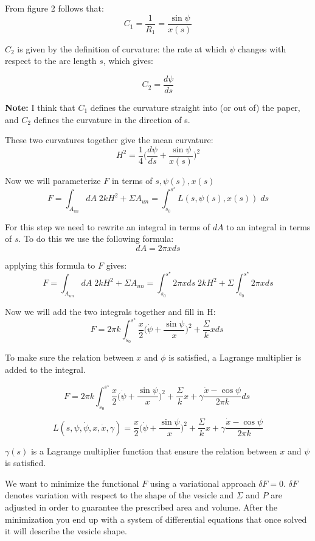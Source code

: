 \documentclass[12pt]{article}
\begin{document}
From figure 2 follows that:
$$
C_1=\frac{1}{R_1}=\frac{\sin{\psi}}{x(s)}
$$

$C_2$ is given by the definition of curvature: the rate at which $\psi$ changes with respect to the arc length $s$, which gives:

$$
C_2=\frac{d\psi}{ds}
$$

\textbf{Note:}  I think that $C_1$ defines the curvature straight into (or out of) the paper, and $C_2$ defines the curvature in the direction of s. 

These two curvatures together give the mean curvature:
$$
H^2=\frac{1}{4}\bigg(\frac{d\psi}{ds}+\frac{\sin{\psi}}{x(s)}\bigg)^2
$$


Now we will parameterize $F$ in terms of $s, \psi(s), x(s)$
$$
F = \int_{A_{un}} dA \; 2kH^2  + \Sigma A_{un} = \int_{s_0}^{s^\star} L(s,\psi(s),x(s)) \; ds
$$


For this step we need to rewrite an integral in terms of $dA$ to an integral in terms of $s$. To do this we use the following formula:
$$
dA=2\pi xds
$$

applying this formula to $F$ gives:
$$
F = \int_{A_{un}} dA \; 2kH^2  + \Sigma A_{un} = \int_{s_0}^{s^\star} 2\pi xds \; 2kH^2 + \Sigma \int_{s_0}^{s^\star} 2\pi x  ds
$$

Now we will add the two integrals together and fill in H:
$$
F = 2\pi k \int_{s_0}^{s^\star} \frac{x}{2} \bigg(\dot{\psi}+\frac{\sin{\psi}}{x}\bigg)^2  + \frac{\Sigma}{k} x ds \;
$$

To make sure the relation between $x$ and $\phi$ is satisfied, a Lagrange multiplier is added to the integral.

$$
F = 2\pi k \int_{s_0}^{s^\star} \frac{x}{2} \bigg(\dot{\psi}+\frac{\sin{\psi}}{x}\bigg)^2  + \frac{\Sigma}{k} x +\gamma\frac{\dot{x}-\cos \psi}{2\pi k}ds\;
$$
 

$$
L(s,\psi,\dot{\psi},x,\dot{x},\gamma) = \frac{x}{2} \bigg(\dot{\psi}+\frac{\sin \psi}{x}\bigg)^2 + \frac{\Sigma}{k} x + \gamma\frac{\dot{x}-\cos \psi}{2\pi k}
$$

$\gamma(s)$ is a Lagrange multiplier function that ensure the relation between $x$ and $\psi$ is satisfied.

We want to minimize the functional $F$ using a variational approach $\delta F=0$. $\delta F$ denotes variation with respect to the shape of the vesicle and $\Sigma$ and $P$ are adjusted in order to guarantee the prescribed area and volume. After the minimization you end up with a system of differential equations that once solved it will describe the vesicle shape.
\end{document}

